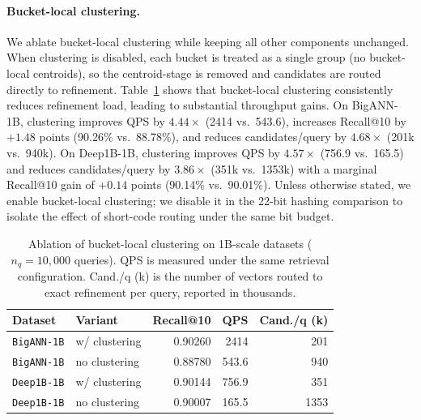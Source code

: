 \documentclass[sigconf, nonacm]{acmart}
\begin{document}
\paragraph{Bucket-local clustering.}
We ablate bucket-local clustering while keeping all other components unchanged.
When clustering is disabled, each bucket is treated as a single group (no bucket-local centroids),
so the centroid-stage is removed and candidates are routed directly to refinement.
Table~\ref{tab:ablation_bucket_clustering} shows that bucket-local clustering consistently reduces refinement load,
leading to substantial throughput gains.
On BigANN-1B, clustering improves QPS by $4.44\times$ (2414 vs.\ 543.6),
increases Recall@10 by $+1.48$ points (90.26\% vs.\ 88.78\%),
and reduces candidates/query by $4.68\times$ (201k vs.\ 940k).
On Deep1B-1B, clustering improves QPS by $4.57\times$ (756.9 vs.\ 165.5) and reduces candidates/query by $3.86\times$
(351k vs.\ 1353k) with a marginal Recall@10 gain of $+0.14$ points (90.14\% vs.\ 90.01\%).
Unless otherwise stated, we enable bucket-local clustering; we disable it in the 22-bit hashing comparison to isolate
the effect of short-code routing under the same bit budget.

\begin{table}[t]
\centering
\small
\setlength{\tabcolsep}{3pt}
\renewcommand{\arraystretch}{1.05}
\caption{Ablation of bucket-local clustering on 1B-scale datasets ($n_q{=}10{,}000$ queries).
QPS is measured under the same retrieval configuration.
Cand./q (k) is the number of vectors routed to exact refinement per query, reported in thousands.}
\label{tab:ablation_bucket_clustering}
\begin{tabular}{llrrr}
\toprule
Dataset & Variant & Recall@10 & QPS & Cand./q (k) \\
\midrule
\texttt{BigANN-1B} & w/ clustering  & 0.90260 & 2414  & 201 \\
\texttt{BigANN-1B} & no clustering  & 0.88780 & 543.6 & 940 \\
\midrule
\texttt{Deep1B-1B} & w/ clustering  & 0.90144 & 756.9 & 351 \\
\texttt{Deep1B-1B} & no clustering  & 0.90007 & 165.5 & 1353 \\
\bottomrule
\end{tabular}
\end{table}
\end{document}

